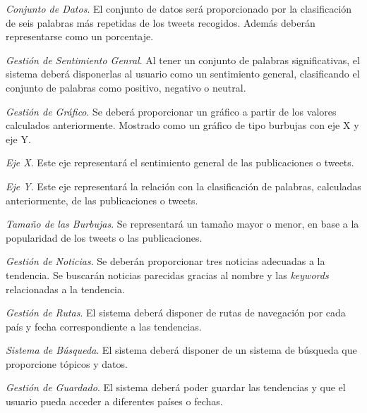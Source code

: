 \begin{enumerate}
{\begin{enumerate}
{\begin{enumerate}
{                \item
                \textit{Conjunto de Datos}. El conjunto de datos será proporcionado por la clasificación de seis palabras más repetidas de los tweets recogidos. Además deberán representarse como un porcentaje.
                }\end{enumerate}
            }\end{enumerate}
        \item
        \textit{Gestión de Sentimiento Genral}. Al tener un conjunto de palabras significativas, el sistema deberá disponerlas al usuario como un sentimiento general, clasificando el conjunto de palabras como positivo, negativo o neutral.
        \begin{enumerate}{\renewcommand{\labelenumii}{R.F. \arabic{enumi}.\arabic{enumii}}
            \item
            \textit{Gestión de Gráfico}. Se deberá proporcionar un gráfico a partir de los valores calculados anteriormente. Mostrado como un gráfico de tipo burbujas con eje X y eje Y.
            \begin{enumerate}{\renewcommand{\labelenumiii}{R.F. \arabic{enumi}.\arabic{enumii}.\arabic{enumiii}}
                \item
                \textit{Eje X}. Este eje representará el sentimiento general de las publicaciones o tweets.
                \item
                \textit{Eje Y}. Este eje representará la relación con la clasificación de palabras, calculadas anteriormente, de las publicaciones o tweets.
                \item
                \textit{Tamaño de las Burbujas}. Se representará un tamaño mayor o menor, en base a la popularidad de los tweets o las publicaciones.
                }\end{enumerate}
            }\end{enumerate}
        \item
        \textit{Gestión de Noticias}. Se deberán proporcionar tres noticias adecuadas a la tendencia. Se buscarán noticias parecidas gracias al nombre y las \textit{keywords} relacionadas a la tendencia.
        \item
        \textit{Gestión de Rutas}. El sistema deberá disponer de rutas de navegación por cada país y fecha correspondiente a las tendencias.
        \item
        \textit{Sistema de Búsqueda}. El sistema deberá disponer de un sistema de búsqueda que proporcione tópicos y datos. 
        \item
        \textit{Gestión de Guardado}. El sistema deberá poder guardar las tendencias y que el usuario pueda acceder a diferentes países o fechas.
}\end{enumerate}

